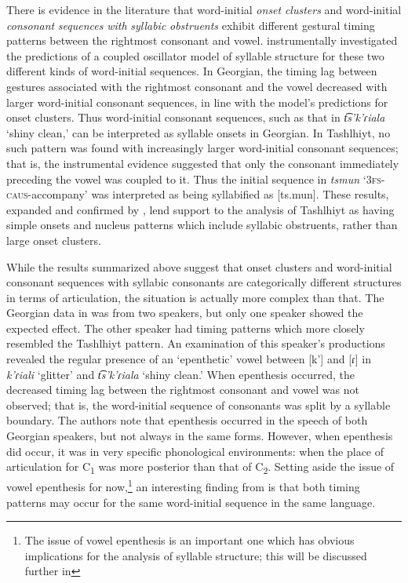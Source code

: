   There is evidence in the literature that word-initial \textit{onset} \textit{clusters} and word-initial \textit{consonant} \textit{sequences} \textit{with} \textit{syllabic} \textit{obstruents} exhibit different gestural timing patterns between the rightmost consonant and vowel. \citet{GoldsteinEtAl2007} instrumentally investigated the predictions of a coupled oscillator model of syllable structure for these two different kinds of word-initial sequences. In Georgian, the timing lag between gestures associated with the rightmost consonant and the vowel decreased with larger word-initial consonant sequences, in line with the model’s predictions for onset clusters. Thus word-initial consonant sequences, such as that in \textit{t͡s’k’ɾiala} ‘shiny clean,’ can be interpreted as syllable onsets in Georgian. In Tashlhiyt, no such pattern was found with increasingly larger word-initial consonant sequences; that is, the instrumental evidence suggested that only the consonant immediately preceding the vowel was coupled to it. Thus the initial sequence in \textit{tsmun} ‘\textsc{3fs}-\textsc{caus}-accompany’ was interpreted as being syllabified as [ts.mun]. These results, expanded and confirmed by \citet{HermesEtAl2011}, lend support to the analysis of Tashlhiyt as having simple onsets and nucleus patterns which include syllabic obstruents, rather than large onset clusters.

  While the results summarized above suggest that onset clusters and word-initial consonant sequences with syllabic consonants are categorically different structures in terms of articulation, the situation is actually more complex than that. The Georgian data in \citet{GoldsteinEtAl2007} was from two speakers, but only one speaker showed the expected effect. The other speaker had timing patterns which more closely resembled the Tashlhiyt pattern. An examination of this speaker’s productions revealed the regular presence of an ‘epenthetic’ vowel between [k’] and [ɾ] in \textit{k'ɾiali} ‘glitter’ and \textit{t͡s’k’ɾiala} ‘shiny clean.’ When epenthesis occurred, the decreased timing lag between the rightmost consonant and vowel was not observed; that is, the word-initial sequence of consonants was split by a syllable boundary. The authors note that epenthesis occurred in the speech of both Georgian speakers, but not always in the same forms. However, when epenthesis did occur, it was in very specific phonological environments: when the place of articulation for C\textsubscript{1} was more posterior than that of C\textsubscript{2}. Setting aside the issue of vowel epenthesis for now,\footnote{ \textrm{The issue of vowel epenthesis is an important one which has obvious implications for the analysis of syllable structure; this will be discussed further in }} an interesting finding from \citet{GoldsteinEtAl2007} is that both timing patterns may occur for the same word-initial sequence in the same language.


